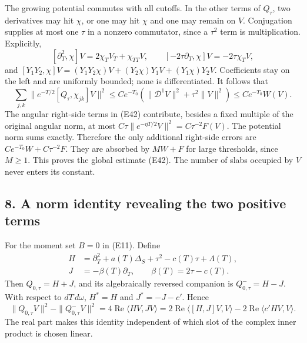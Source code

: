 \documentclass[
  11pt,
]{article}
\makeatletter
\let\ReaderOriginalAnchorStart\hyper@anchorstart
\let\ReaderOriginalAnchorEnd\hyper@anchorend
\let\ReaderPendingAliases\@empty
\def\ReaderArmAliases#1{\gdef\ReaderPendingAliases{#1}}
\def\hyper@anchorstart#1{\ReaderIfNativeAnchorTF{#1}{\ReaderPendingAliases\global\let\ReaderPendingAliases\@empty}{}\ReaderOriginalAnchorStart{#1}}
\makeatother
\begin{document}
The growing potential commutes with all cutoffs. In the other terms of
\(Q_\tau\), two derivatives may hit \(\chi\), or one may hit \(\chi\)
and one may remain on \(V\). Conjugation supplies at most one \(\tau\)
in a nonzero commutator, since a \(\tau^2\) term is multiplication.
Explicitly, \[
 [\partial_T^2,\chi]V=2\chi_TV_T+\chi_{TT}V,\qquad
 [-2\tau\partial_T,\chi]V=-2\tau\chi_TV,
\] and \([Y_1Y_2,\chi]V=(Y_1Y_2\chi)V+(Y_2\chi)Y_1V+(Y_1\chi)Y_2V\).
Coefficients stay on the left and are uniformly bounded; none is
differentiated. It follows that \[
 \sum_{j,k}\|e^{-T/2}[Q_\tau,\chi_{jk}]V\|^2
       \leq C e^{-T_0}
                    (\|\mathcal D^1V\|^2+\tau^2\|V\|^2)
       \leq C e^{-T_0}W(V).                                    \tag{E45}
\] The angular right-side terms in (E42) contribute, besides a fixed
multiple of the original angular norm, at most
\(C\tau\|e^{-\eta T/2}V\|^2=C\tau^{-2}F(V)\). The potential norm sums
exactly. Therefore the only additional right-side errors are
\(Ce^{-T_0}W+C\tau^{-2}F\). They are absorbed by \(MW+F\) for large
thresholds, since \(M\geq1\). This proves the global estimate (E42). The
number of slabs occupied by \(V\) never enters its constant.

\ReaderArmAliases{\ReaderOriginalAnchorStart{AN03-EXU-008}\ReaderOriginalAnchorEnd\begingroup\expandafter\def\csname @currentHref\endcsname{AN03-EXU-008}\label{AN03-EXU-008}\endgroup\ReaderOriginalAnchorStart{an03-exu-008-a-norm-identity-revealing-the-two-positive-terms}\ReaderOriginalAnchorEnd\begingroup\expandafter\def\csname @currentHref\endcsname{an03-exu-008-a-norm-identity-revealing-the-two-positive-terms}\label{an03-exu-008-a-norm-identity-revealing-the-two-positive-terms}\endgroup\ReaderOriginalAnchorStart{8-a-norm-identity-revealing-the-two-positive-terms}\ReaderOriginalAnchorEnd\begingroup\expandafter\def\csname @currentHref\endcsname{8-a-norm-identity-revealing-the-two-positive-terms}\label{8-a-norm-identity-revealing-the-two-positive-terms}\endgroup\ReaderOriginalAnchorStart{a-norm-identity-revealing-the-two-positive-terms}\ReaderOriginalAnchorEnd}
\subsection{8. A norm identity revealing the two positive
terms}\label{a-norm-identity-revealing-the-two-positive-terms}

For the moment set \(B=0\) in (E11). Define \[
\begin{split}
 H&=\partial_T^2+a(T)\Delta_S+\tau^2-c(T)\tau+\Lambda(T),\\
 J&=-\beta(T)\partial_T,\qquad \beta(T)=2\tau-c(T).
\end{split}                                                       \tag{E46}
\] Then \(Q_{0,\tau}=H+J\), and its algebraically reversed companion is
\(Q_{0,\tau}^-=H-J\). With respect to \(dT\,d\omega\), \(H^*=H\) and
\(J^*=-J-c'\). Hence \[
 \|Q_{0,\tau}V\|^2-\|Q_{0,\tau}^-V\|^2
       =4\operatorname{Re}\langle HV,JV\rangle
       =2\operatorname{Re}\langle[H,J]V,V\rangle
                  -2\operatorname{Re}\langle c'HV,V\rangle.    \tag{E47}
\] The real part makes this identity independent of which slot of the
complex inner product is chosen linear.
\end{document}
